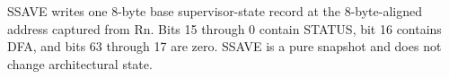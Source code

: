SSAVE writes one 8-byte base supervisor-state record at the 8-byte-aligned address captured from Rn. Bits 15 through 0 contain STATUS, bit 16 contains DFA, and bits 63 through 17 are zero. SSAVE is a pure snapshot and does not change architectural state.

